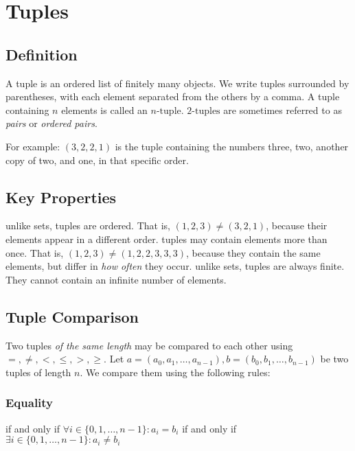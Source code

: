 \chapter{Tuples}\label{ch:tuples}
\section{Definition}
\begin{definition}
  A tuple is an ordered list of finitely many objects.
  We write tuples surrounded by parentheses, with each element
  separated from the others by a comma.
  A tuple containing \(n\) elements is called an \(n\text{-tuple}\).
  \(2\text{-tuples}\) are sometimes referred to as \emph{pairs} or \emph{ordered pairs}.
\end{definition}
\begin{example}
  [A tuple]
  For example: \((3, 2, 2, 1)\) is the tuple
  containing the numbers three, two, another copy of two,
  and one, in that specific order.
\end{example}

\section{Key Properties}
\begin{itemize}
   unlike sets, tuples are ordered. That is,
      \((1,2,3) \neq (3,2,1)\),
  because their elements appear in a different order.
   tuples may contain elements more than once.
  That is, \((1,2,3) \neq (1,2,2,3,3,3)\), because they contain the same
  elements, but differ in \emph{how often} they occur.
   unlike sets, tuples are always finite.
  They cannot contain an infinite number of elements.
\end{itemize}

\section{Tuple Comparison}
Two tuples \emph{of the same length} may be compared to each other using
\(=, \neq, <, \leq, >, \geq\).
Let \(a = (a_{0}, a_{1}, \dots, a_{n-1}), b = (b_{0}, b_{1}, \dots, b_{n-1})\) be
two tuples of length \(n\). We compare them using the following rules:

\subsection*{Equality}
\begin{itemize}
   if and only if \(\forall i \in \{0, 1, \dots, n-1\}: a_{i} = b_{i}\)
   if and only if \(\exists i \in \{0, 1, \dots, n-1\}: a_{i} \neq b_{i}\)
\end{itemize}

